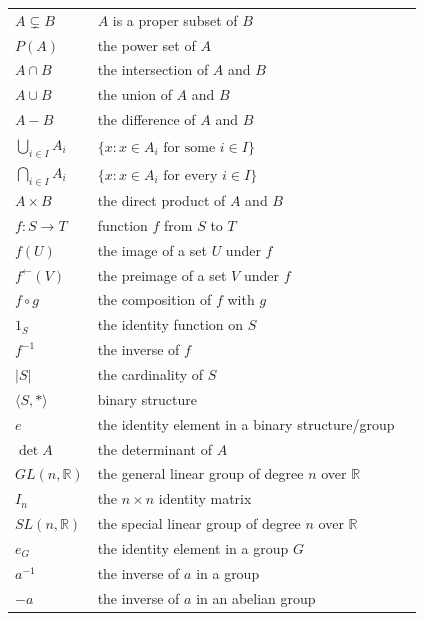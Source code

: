 \documentclass[10pt,]{book}
\theoremstyle{plain}
\theoremstyle{definition}
\theoremstyle{definition}
\theoremstyle{definition}
\theoremstyle{definition}
\numberwithin{equation}{section}
\def\R{\mathbb{R}}
\begin{document}
\begin{longtable}[l]{lp{}r}
$A\subsetneq B$& \(A\) is a proper subset of \(B\)&\pageref{notation-15}\\
$P(A)$&the power set of \(A\)&\pageref{notation-16}\\
$A\cap B$&the intersection of  \(A\) and \(B\)&\pageref{notation-17}\\
$A\cup B$&the union of  \(A\) and \(B\)&\pageref{notation-18}\\
$A - B$&the difference of  \(A\) and \(B\)&\pageref{notation-19}\\
$\bigcup_{i\in I}A_i$&\(\{x: x\in A_i \text{ for some }  i\in I\}\)&\pageref{notation-20}\\
$\bigcap_{i\in I}A_i$&\(\{x: x\in A_i \text{ for every }  i\in I\}\)&\pageref{notation-21}\\
$A\times B$&the direct product of  \(A\) and \(B\)&\pageref{notation-22}\\
$f:S\to T$&function \(f\) from  \(S\) to  \(T\)&\pageref{notation-23}\\
$f(U)$&the image of a set \(U\) under \(f\)&\pageref{notation-24}\\
$f^{\leftarrow}(V)$&the preimage of a set \(V\) under \(f\)&\pageref{notation-25}\\
$f\circ g$&the composition of  \(f\) with  \(g\)&\pageref{notation-26}\\
$1_S$&the identity function on \(S\)&\pageref{notation-27}\\
$f^{-1}$&the inverse of \(f\)&\pageref{notation-28}\\
$|S|$&the cardinality of  \(S\)&\pageref{notation-29}\\
$\langle S, *\rangle $&binary structure &\pageref{notation-30}\\
$e$&the identity element in a binary structure/group&\pageref{notation-31}\\
$\det A$&the determinant of \(A\)&\pageref{notation-32}\\
$GL(n,\R)$&the general linear group of degree \(n\) over \(\R\)&\pageref{notation-33}\\
$I_n$&the \(n \times n\) identity matrix&\pageref{notation-34}\\
$SL(n,\R)$&the special linear group of degree \(n\) over \(\R\)&\pageref{notation-35}\\
$e_G$&the identity element in a group \(G\)&\pageref{notation-36}\\
$a^{-1}$&the inverse of \(a\) in a group&\pageref{notation-37}\\
$-a$&the inverse of \(a\) in an abelian group&\pageref{notation-38}\\

\end{longtable}
\end{document}
